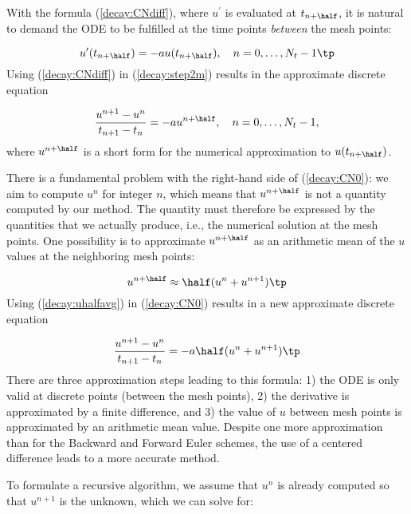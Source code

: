 \documentclass[graybox,sectrefs,envcountresetchap,open=right,final]{svmonodo}
\begin{document}
With the formula (\ref{decay:CNdiff}), where $u^{\prime}$ is evaluated at
$t_{n+\half}$, it is natural to demand the
ODE to be fulfilled at the time points \emph{between} the mesh points:

\begin{equation}
u^{\prime}(t_{n+\half}) = -au(t_{n+\half}),\quad n=0,
\ldots,N_t-1\tp
\label{decay:step2m}
\end{equation}
Using (\ref{decay:CNdiff}) in (\ref{decay:step2m}) results in
the approximate discrete equation

\begin{equation}
\frac{u^{n+1}-u^n}{t_{n+1}-t_n} = -au^{n+\half},\quad n=0,\ldots,N_t-1,
\label{decay:CN0}
\end{equation}
where $u^{n+\half}$ is a short form for the numerical approximation
to $u(t_{n+\half})$.

There is a fundamental problem with the right-hand side of
(\ref{decay:CN0}): we aim to compute $u^n$ for integer $n$, which means
that $u^{n+\half}$ is not a quantity computed by our method. The
quantity must
therefore be
expressed by the quantities that we actually produce, i.e.,
the numerical solution at the
mesh points. One possibility is to approximate $u^{n+\half}$
as an arithmetic mean of the $u$ values at the neighboring mesh points:


\begin{equation}
u^{n+\half} \approx \half (u^n + u^{n+1})\tp
\label{decay:uhalfavg}
\end{equation}
Using (\ref{decay:uhalfavg}) in (\ref{decay:CN0}) results in a new
approximate discrete equation

\begin{equation}
\frac{u^{n+1}-u^n}{t_{n+1}-t_n} = -a\half (u^n + u^{n+1})\tp
\label{decay:CN1}
\end{equation}
There are three approximation steps leading to this formula:
1) the ODE is only valid at discrete points (between the mesh points),
2) the derivative is approximated by a finite difference, and 3) the
value of $u$ between mesh points is approximated by an arithmetic mean
value. Despite one more approximation than for the Backward and Forward
Euler schemes, the use of a centered difference leads to a more
accurate method.

To formulate a recursive algorithm,
we assume that $u^n$ is already computed so that $u^{n+1}$ is the
unknown, which we can solve for:
\end{document}
